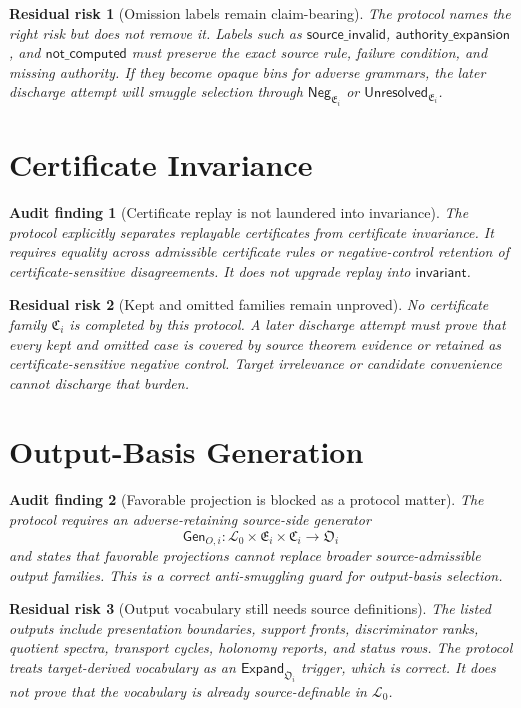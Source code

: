 \documentclass[11pt]{article}
\newcommand{\Lang}{\mathcal{L}_{0}}
\newcommand{\EnumFam}{\mathfrak{E}}
\newcommand{\CertFam}{\mathfrak{C}}
\newcommand{\OutFam}{\mathfrak{O}}
\newcommand{\Neg}{\mathsf{Neg}}
\newcommand{\Expand}{\mathsf{Expand}}
\newcommand{\Unres}{\mathsf{Unresolved}}
\newtheorem{auditfinding}{Audit finding}
\newtheorem{residualrisk}{Residual risk}
\begin{document}
\begin{residualrisk}[Omission labels remain claim-bearing]
The protocol names the right risk but does not remove it. Labels such as
\(\mathsf{source\_invalid}\), \(\mathsf{authority\_expansion}\), and
\(\mathsf{not\_computed}\) must preserve the exact source rule, failure
condition, and missing authority. If they become opaque bins for adverse
grammars, the later discharge attempt will smuggle selection through
\(\Neg_{\EnumFam_i}\) or \(\Unres_{\EnumFam_i}\).
\end{residualrisk}

\section{Certificate Invariance}

\begin{auditfinding}[Certificate replay is not laundered into invariance]
The protocol explicitly separates replayable certificates from certificate
invariance. It requires equality across admissible certificate rules or
negative-control retention of certificate-sensitive disagreements. It does
not upgrade replay into \(\mathsf{invariant}\).
\end{auditfinding}

\begin{residualrisk}[Kept and omitted families remain unproved]
No certificate family \(\CertFam_i\) is completed by this protocol. A later
discharge attempt must prove that every kept and omitted case is covered by
source theorem evidence or retained as certificate-sensitive negative
control. Target irrelevance or candidate convenience cannot discharge that
burden.
\end{residualrisk}

\section{Output-Basis Generation}

\begin{auditfinding}[Favorable projection is blocked as a protocol matter]
The protocol requires an adverse-retaining source-side generator
\[
\mathsf{Gen}_{O,i}:\Lang\times\EnumFam_i\times\CertFam_i\to\OutFam_i
\]
and states that favorable projections cannot replace broader
source-admissible output families. This is a correct anti-smuggling guard for
output-basis selection.
\end{auditfinding}

\begin{residualrisk}[Output vocabulary still needs source definitions]
The listed outputs include presentation boundaries, support fronts,
discriminator ranks, quotient spectra, transport cycles, holonomy reports,
and status rows. The protocol treats target-derived vocabulary as an
\(\Expand_{\OutFam_i}\) trigger, which is correct. It does not prove that the
vocabulary is already source-definable in \(\Lang\).
\end{residualrisk}
\end{document}
